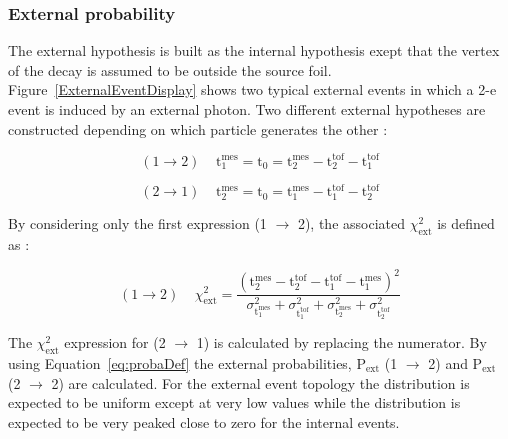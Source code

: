 \documentclass[main.tex]{subfiles}
\begin{document}
\FloatBarrier


\subsubsection{External probability}\label{sec:Pext}


\NI The external hypothesis is built as the internal hypothesis exept that the vertex of the decay is assumed to be outside the source foil. Figure~\ref{ExternalEventDisplay} shows two typical external events in which a 2-e event is induced by an external photon. Two different external hypotheses are constructed depending on which particle generates the other :


\begin{equation}
(\text{1} \rightarrow \text{2})~~~~~ \text{t}_\text{1}^{\text{mes}} = \text{t}_\text{0} = \text{t}_\text{2}^{\text{mes}} - \text{t}_\text{2}^{\text{tof}} - \text{t}_\text{1}^{\text{tof}}
\end{equation}

\begin{equation}
(\text{2} \rightarrow \text{1})~~~~~ \text{t}_\text{2}^{\text{mes}} = \text{t}_\text{0} = \text{t}_\text{1}^{\text{mes}} - \text{t}_\text{1}^{\text{tof}} - \text{t}_\text{2}^{\text{tof}}
\end{equation}


\NI By considering only the first expression (1 $\rightarrow$ 2), the associated $\chi^\text{2}_{\text{ext}}$ is defined as : 

\begin{equation}
(\text{1} \rightarrow \text{2})~~~~~ \chi^\text{2}_{\text{ext}} = \frac{ (\text{t}_\text{2}^{\text{mes}} - \text{t}_\text{2}^{\text{tof}} - \text{t}_\text{1}^{\text{tof}} - \text{t}_\text{1}^{\text{mes}} )^\text{2} }{  \sigma^{\text{2}}_{\text{t}_\text{1}^{\text{mes}}} + \sigma^{\text{2}}_{\text{t}_\text{1}^{\text{tof}}} + \sigma^{\text{2}}_{\text{t}_\text{2}^{\text{mes}}} + \sigma^{\text{2}}_{\text{t}_\text{2}^{\text{tof}}} }
\end{equation}


\NI The $\chi^\text{2}_{\text{ext}}$ expression for (2 $\rightarrow$ 1) is calculated by replacing the numerator. By using Equation~\ref{eq:probaDef} the external probabilities, P$_{\text{ext}}$ (1 $\rightarrow$ 2) and P$_{\text{ext}}$ (2 $\rightarrow$ 2) are calculated. For the external event topology the distribution is expected to be uniform except at very low values while the distribution is expected to be very peaked close to zero for the internal events.
\end{document}
